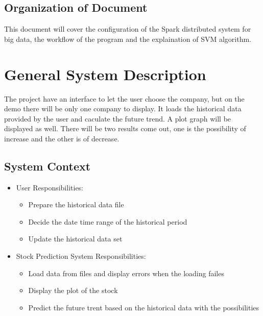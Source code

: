 \documentclass[12pt]{article}
\newcommand{\progname}{Stock Prediction System} %
\begin{document}
\subsection{Organization of Document}
This document will cover the configuration of the Spark distributed system for
big data, the workflow of the program and the explaination  of SVM algorithm.
\section{General System Description}

The project have an interface to let the user choose the company, but on the
demo there will be only one company to display. It loads the historical data
provided by the user and caculate  the future trend. A plot
graph will be displayed  as well. There will be two results come out, one is the
possibility of increase and the other is of decrease.  

\subsection{System Context}

\begin{itemize}
\item User Responsibilities:
\begin{itemize}
\item Prepare the historical data file 
\item Decide the date time range of the historical period
\item Update the historical data set
\end{itemize}
\item \progname{} Responsibilities:
\begin{itemize}
\item Load data  from files and display errors when the loading failes
\item Display the plot of the stock
\item Predict the future trent  based on the historical data with the possibilities
\end{itemize}
\end{itemize}
\end{document}
